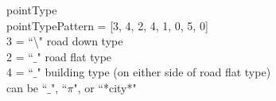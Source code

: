 \documentclass{article}
\begin{document}
\begingroup
pointType
\\
pointTypePattern = [3, 4, 2, 4, 1, 0, 5, 0]
\\
3 = ``\textbackslash" road down type
\\    
2 = ``$\_$" road flat type
\\
4 = ``$\_$" building type (on either side of road flat type)
\\
can be ``$\_$", ``$\pi$", or ``*city*"
\endgroup
\end{document}
